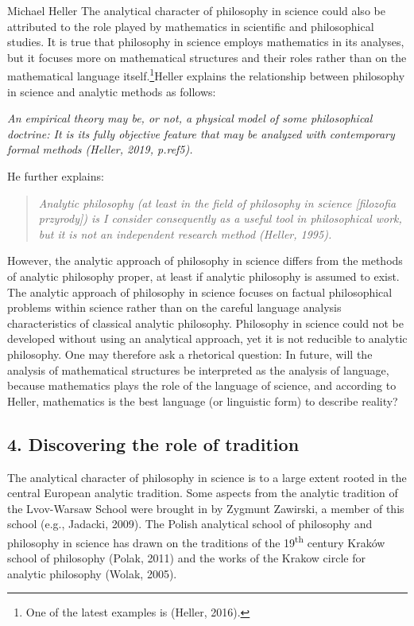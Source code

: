 \begin{artengenv}{Michael Heller}
The analytical character of philosophy in science could also be attributed to the role played by mathematics in
scientific and philosophical studies. It is true that philosophy in science employs mathematics in its analyses, but it
focuses more on mathematical structures and their roles rather than on the mathematical language itself.\footnote{One
of the latest examples is (Heller, 2016).}\textstyleFootnoteAnchor{ }Heller explains the relationship between
philosophy in science and analytic methods as follows:

{\itshape
An empirical theory may be, or not, a physical model of some philosophical doctrine: It is its fully objective feature
that may be analyzed with contemporary formal methods (Heller, 2019, p.ref5). }

He further explains:

\begin{quotation}
\textit{Analytic philosophy (at least in the field of philosophy in science [filozofia przyrody]) is I consider
consequently as a useful tool in philosophical work, but it is not an independent research method (Heller, 1995).}

\end{quotation}
However, the analytic approach of philosophy in science differs from the methods of analytic philosophy proper, at least
if analytic philosophy is assumed to exist. The analytic approach of philosophy in science focuses on factual
philosophical problems within science rather than on the careful language analysis characteristics of classical
analytic philosophy. Philosophy in science could not be developed without using an analytical approach, yet it is not
reducible to analytic philosophy. One may therefore ask a rhetorical question: In future, will the analysis of
mathematical structures be interpreted as the analysis of language, because mathematics plays the role of the language
of science, and according to Heller, mathematics is the best language (or linguistic form) to describe reality?

\subsection{4. Discovering the role of tradition}
The analytical character of philosophy in science is to a large extent rooted in the central European analytic
tradition. Some aspects from the analytic tradition of the Lvov-Warsaw School were brought in by Zygmunt Zawirski, a
member of this school (e.g., Jadacki, 2009). The Polish analytical school of philosophy and philosophy in science has
drawn on the traditions of the 19\textsuperscript{th} century Kraków school of philosophy (Polak, 2011) and the works
of the Krakow circle for analytic philosophy (Wolak, 2005). 


\end{artengenv}
